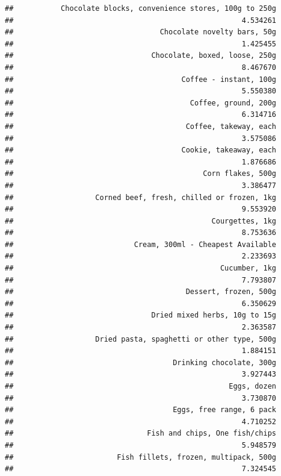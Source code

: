 \documentclass[
  landscape]{article}
\begin{document}
\begin{verbatim}
##           Chocolate blocks, convenience stores, 100g to 250g 
##                                                     4.534261 
##                                  Chocolate novelty bars, 50g 
##                                                     1.425455 
##                                Chocolate, boxed, loose, 250g 
##                                                     8.467670 
##                                       Coffee - instant, 100g 
##                                                     5.550380 
##                                         Coffee, ground, 200g 
##                                                     6.314716 
##                                        Coffee, takeway, each 
##                                                     3.575086 
##                                       Cookie, takeaway, each 
##                                                     1.876686 
##                                            Corn flakes, 500g 
##                                                     3.386477 
##                   Corned beef, fresh, chilled or frozen, 1kg 
##                                                     9.553920 
##                                              Courgettes, 1kg 
##                                                     8.753636 
##                            Cream, 300ml - Cheapest Available 
##                                                     2.233693 
##                                                Cucumber, 1kg 
##                                                     7.793807 
##                                        Dessert, frozen, 500g 
##                                                     6.350629 
##                                Dried mixed herbs, 10g to 15g 
##                                                     2.363587 
##                   Dried pasta, spaghetti or other type, 500g 
##                                                     1.884151 
##                                     Drinking chocolate, 300g 
##                                                     3.927443 
##                                                  Eggs, dozen 
##                                                     3.730870 
##                                     Eggs, free range, 6 pack 
##                                                     4.710252 
##                               Fish and chips, One fish/chips 
##                                                     5.948579 
##                        Fish fillets, frozen, multipack, 500g 
##                                                     7.324545 

\end{verbatim}
\end{document}
